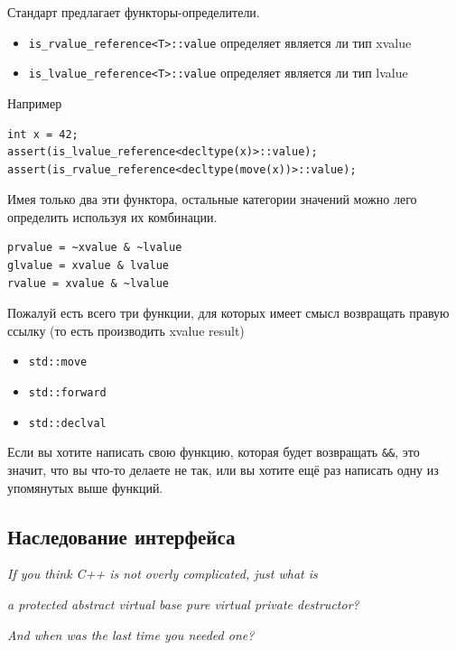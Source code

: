 \documentclass[a4paper,12pt,oneside]{article}
\begin{document}
Стандарт предлагает функторы-определители.

\begin{itemize}
\item \lstinline!is_rvalue_reference<T>::value! определяет является ли  тип xvalue
\item \lstinline!is_lvalue_reference<T>::value! определяет является ли тип lvalue
\end{itemize}

Например

\begin{lstlisting}
int x = 42;
assert(is_lvalue_reference<decltype(x)>::value);
assert(is_rvalue_reference<decltype(move(x))>::value);
\end{lstlisting}

Имея только два эти функтора, остальные категории значений можно лего определить используя их комбинации.

\begin{verbatim}
prvalue = ~xvalue & ~lvalue
glvalue = xvalue & lvalue
rvalue = xvalue & ~lvalue
\end{verbatim}

Пожалуй есть всего три функции, для которых имеет смысл возвращать правую ссылку (то есть производить xvalue result)

\begin{itemize}
\item \lstinline!std::move!
\item \lstinline!std::forward!
\item \lstinline!std::declval!
\end{itemize}

Если вы хотите написать свою функцию, которая будет возвращать \lstinline!&&!, это значит, что вы что-то делаете не так, или вы хотите ещё раз написать одну из упомянутых выше функций.

\pagebreak
\subsection{Наследование интерфейса}\label{IntfInheritance}

\hfill\textit{If you think C++ is not overly complicated, just what is} 

\hfill\textit{a protected abstract virtual base pure virtual private destructor?}

\hfill\textit{And when was the last time you needed one?}{\vspace{0.5em}}
\end{document}
